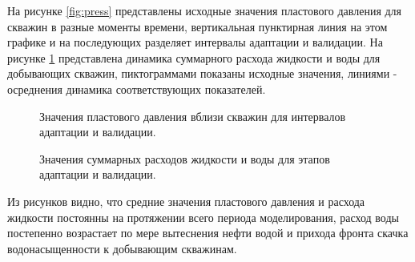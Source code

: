 \documentclass{article}
\begin{document}
На рисунке \ref{fig:press} представлены исходные значения пластового давления для скважин в разные моменты времени, вертикальная пунктирная линия на этом графике и на последующих разделяет интервалы адаптации и валидации. На рисунке \ref{fig:qlic} представлена динамика суммарного расхода жидкости и воды для добывающих скважин, пиктограммами показаны исходные значения, линиями - осреднения динамика соответствующих показателей.
\begin{figure} 
    \begin{minipage}[h]{0.48\linewidth}
      \caption{Значения пластового давления вблизи скважин для интервалов адаптации и валидации.}
      \label{fig:press}
    \end{minipage} \hfill
    \begin{minipage}[h]{0.48\linewidth}
      \caption{Значения суммарных расходов жидкости и воды для этапов адаптации и валидации.}
      \label{fig:qlic}
    \end{minipage} 
\end{figure}
Из рисунков видно, что средние значения пластового давления и расхода жидкости постоянны на протяжении всего периода моделирования, расход воды постепенно возрастает по мере вытеснения нефти водой и прихода фронта скачка  водонасыщенности к добывающим скважинам.
\end{document}
